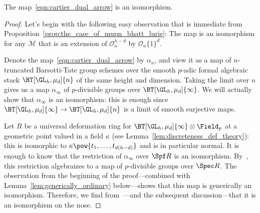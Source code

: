 \documentclass[10pt]{amsart}
\begin{document}
\begin{theorem}
\label{thm:cartier_duality}
The map~\eqref{eqn:cartier_dual_arrow} is an isomorphism.
\end{theorem}
\begin{proof}
Let's begin with the following easy observation that is immediate from Proposition~\ref{prop:the_case_of_mupn_bhatt_lurie}: The map is an isomorphism for any $\mathcal{M}$ that is an extension of $\mathcal{O}^{h-d}_n$ by $\mathcal{O}_n\{1\}^d$.

Denote the map~\eqref{eqn:cartier_dual_arrow} by $\alpha_n$, and view it as a map of $n$-truncated Barsotti-Tate group schemes over the smooth $p$-adic formal algebraic stack $\BT[\GL_h,\mu_d]{n}$ of the same height and dimension. Taking the limit over $n$ gives us a map $\alpha_\infty$ of $p$-divisible groups over $\BT[\GL_h,\mu_d]{\infty}$. We will actually show that $\alpha_\infty$ is an isomorphism: this is enough since $\BT[\GL_h,\mu_d]{\infty}\to \BT[\GL_h,\mu_d]{n}$ is a limit of smooth surjective maps.

Let $R$ be a universal deformation ring for $\BT[\GL_h,\mu_d]{\infty}\otimes\Field_p$ at a geometric point valued in a field $\kappa$ (see Lemma~\ref{lem:discreteness_def_theory}): this is isomorphic to $\kappa\pow{t_1,\ldots,t_{d(h-d)}}$ and is in particular normal. It is enough to know that the restriction of $\alpha_\infty$ over $\Spf R$ is an isomorphism. By~\cite[Lemma 2.4.4]{dejong:formal_rigid}, this restriction algebraizes to a map of $p$-divisible groups over $\Spec R$. The observation from the beginning of the proof---combined with Lemma~\ref{lem:generically_ordinary} below---shows that this map is generically an isomorphism. Therefore, we find from~\cite[Corollary 1.2]{de-Jong1998-ki}---and the subsequent discussion---that it is an isomorphism on the nose. 
\end{proof}
\end{document}
